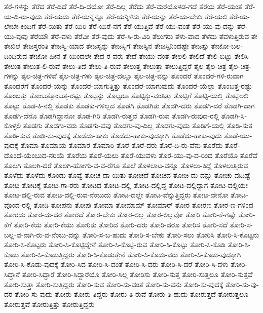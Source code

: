 {ತೆರೆ-ಗಳನ್ನು
ತೆರೆದ
ತೆರೆ-ದಿದೆ
ತೆರೆ-ದಿ-ದೆಯೋ
ತೆರೆ-ದಿಲ್ಲ
ತೆರೆದು
ತೆರೆ-ಮರೆಯೊಳಡ-ಗದೆ
ತೆರೆಯ
ತೆರೆ-ಯಂತೆ
ತೆರೆ-ಯ-ದಿ-ರು-ವುದು
ತೆರೆ-ಯದು
ತೆರೆ-ಯನ್ನಿನ್ನೂ
ತೆರೆ-ಯನ್ನಿಳಿಸು
ತೆರೆ-ಯನ್ನು
ತೆರೆ-ಯ-ಬೇಕು
ತೆರೆ-ಯಲಿ
ತೆರೆ-ಯ-ಲೇಬೇ-ಕಿಂದಿಗೆ
ತೆರೆ-ಯಿತು
ತೆರೆ-ಯಿರಿ
ತೆರೆ-ಯಿರೆ-ನಗೆ
ತೆರೆ-ಯುತ್ತಿವೆ
ತೆರೆ-ಯು-ವಂತೆ
ತೆರೆ-ಯು-ವು-ದನ್ನು
ತೆರೆ-ಯು-ವುವು
ತೆರೆಯೌ
ತೆರೆ-ವಳು
ತೆರೆವೀ
ತೆರೆ-ವುದು
ತೆರೆ-ಸಿ-ರು-ವಿರಿ
ತೆಲುಗರು
ತೆಳು-ವಾದ
ತೆಳೆದು
ತೆವಳುತ್ತಿರುವ
ತೇ
ತೇಖಿಲೆ
ತೇಜಸ್ತರಂತಿ
ತೇಜಸ್ವಿ-ಯಾದ
ತೇಜಸ್ಸನ್ನು
ತೇಜಸ್ಸಿಗೆ
ತೇಜಸ್ಸಿನ
ತೇಜಸ್ಸಿನಿಂದಷ್ಟೇ
ತೇಜಸ್ಸು
ತೇಜೋ-ಬಲ-ದಿಂದಿರುವ
ತೇಜೋ-ಹೀನ-ತೆ-ಯಿಂದಲೇ
ತೇದ-ರ-ವರು
ತೇದೆ
ತೇಯು-ವಂತೆ
ತೇಲಲಿ
ತೇಲಿದೆ
ತೇಲಿ-ಬಿಟ್ಟು
ತೇಲಿಸಿ
ತೇಲುತ
ತೇಲುತ-ಲಿ-ರುವೆ
ತೇಲು-ತಿದೆ
ತೇಲು-ತಿ-ರುವೆ
ತೇಲುತ್ತ
ತೇಲುತ್ತಾ
ತೇಲುತ್ತಿದ್ದರೆ
ತೈಲ
ತೈಲ-ಚಿತ್ರ
ತೈಲ-ಚಿತ್ರ-ಗಳನ್ನು
ತೈಲ-ಚಿತ್ರ-ಗಳಿವೆ
ತೈಲ-ಚಿತ್ರ-ಗಳು
ತೈಲ-ಚಿತ್ರ-ದಲ್ಲೂ
ತೈಲ-ಚಿತ್ರ-ವನ್ನು
ತೊಂದರೆ
ತೊಂದರೆ-ಗಳಿ-ರುವಾಗ
ತೊಂದರೆಗೆ
ತೊಂದರೆ-ಯನ್ನು
ತೊಂದರೆ-ಯಾಗುತ್ತಿತ್ತು
ತೊಂದರೆ-ಯಾಗುವುದು
ತೊಂದರೆ-ಯೆಲ್ಲಾ
ತೊಂಬತ್ತ-ರಷ್ಟು
ತೊಂಬತ್ತು
ತೊಂಬತ್ತೊಂಬತ್ತ-ರಷ್ಟು
ತೊಟ್ಟನ್ನು
ತೊಟ್ಟರೂ
ತೊಟ್ಟಿಕ್ಕು-ವಂತಿತ್ತು
ತೊಟ್ಟಿಗೆ
ತೊಟ್ಟಿ-ಯಲ್ಲಿ
ತೊಟ್ಟಿಲಲಿ
ತೊಟ್ಟು
ತೊಡ-ಕಿ-ನಲ್ಲಿ
ತೊಡಕು
ತೊಡಕು-ಗಳಿಲ್ಲದ
ತೊಡಗಿ
ತೊಡಗಿತು
ತೊಡಗಿ-ದರು
ತೊಡಗಿ-ದರೆ
ತೊಡಗಿ-ದಾಗ
ತೊಡಗಿ-ದೆನೊ
ತೊಡಗಿದ್ದಾನೋ
ತೊಡ-ಗಿರಿ
ತೊಡಗಿ-ರುತ್ತವೆ
ತೊಡಗಿ-ರುವ
ತೊಡಗಿ-ರುವುದ-ರಲ್ಲಿ
ತೊಡಗಿ-ಸಿ-ಕೊಳ್ಳಲಿ
ತೊಡಗು
ತೊಡಗು-ವರು
ತೊಡಗು-ವವು
ತೊಡಗು-ವು-ದಿಲ್ಲ
ತೊಡಗು-ವುದು
ತೊಡಿಗೆ-ಯಲ್ಲಿ
ತೊಡಿ-ಸುತ
ತೊಡಿ-ಸುವ
ತೊಡಿ-ಸು-ವುದಕ್ಕೆ
ತೊಡೆದು-ಹಾಕು
ತೊಡೆದು-ಹಾಕು-ವುದಕ್ಕಾಗಿ
ತೊಡೆದು-ಹಾಕು-ವುದು
ತೊಡೆ-ಯು-ವುದಕ್ಕೆ
ತೊಮಾ
ತೊಮಾಯ
ತೊಮಾರ
ತೊಮಾರಿ
ತೊರೆ
ತೊರೆ-ದರು
ತೊರೆ-ದಿ-ರು-ವೆನು
ತೊರೆದು
ತೊರೆ-ದೊಂದೆ-ಯೆಂಬುದ-ನರಿಯೆ
ತೊರೆಯ
ತೊರೆ-ಯಲು
ತೊರೆ-ಯುವಳು
ತೊರೆ-ಯು-ವು-ದ-ರಿಂದ
ತೊರೆಯೊ
ತೊರೆವೆ
ತೊಲಗಿ
ತೊಲಗಿ-ದರೆ
ತೊಲಗಿ-ಹೋಗು-ವ-ವ-ರೆಗೂ
ತೊಲೆ
ತೊಳಲಾಟ-ವನ್ನೂ
ತೊಳಲು-ತಿದ್ದೆ
ತೊಳಲುತ್ತಿರುವ
ತೊಳೆದು
ತೊಳೆದು-ಕೊಂಡು
ತೊವ್ವೆ
ತೋಚ-ದಾ-ಯಿತು
ತೋಚದೆ
ತೋಚಿದ
ತೋಚಿ-ದು-ದನ್ನು
ತೋಚು-ವುದಿಷ್ಟೆ
ತೋಟ
ತೋಟಕ್ಕೆ
ತೋಟ-ಗಾ-ರರು
ತೋಟದ
ತೋಟ-ದಲ್ಲಿ
ತೋಟ-ದಲ್ಲಿದ್ದ
ತೋಟ-ದಲ್ಲಿದ್ದಾಗ
ತೋಟ-ದಲ್ಲಿಯೇ
ತೋಟ-ದಲ್ಲಿ-ರುವ
ತೋಟ-ದಲ್ಲಿ-ರುವ-ನೆಂಬುದು
ತೋಟ-ದಲ್ಲೇ
ತೋಟ-ವೆನ್ನುತ್ತಿದ್ದರು
ತೋಟ-ವೇನೋ
ತೋಟ-ವೊಂದ-ರಲ್ಲಿ
ತೋಡಿ
ತೋಪನು
ತೋಪು
ತೋಮಾ
ತೋಮಾಮ್
ತೋಮಾರ್
ತೋರ
ತೋರಣ
ತೋರ-ಣ-ಗಳಿಂದ
ತೋರದು
ತೋರ-ದು-ದರ
ತೋರದೆ
ತೋರ-ಬೇಕು
ತೋರ-ಲಿಲ್ಲ
ತೋರ-ಲಿಲ್ಲವೋ
ತೋರಿ
ತೋರಿ-ಕೆ-ಗಷ್ಟೇ
ತೋರಿ-ಕೆಗೆ
ತೋರಿ-ಕೆಯ
ತೋರಿ-ಕೆಯು
ತೋರಿತು
ತೋರಿದ
ತೋರಿ-ದರು
ತೋರಿ-ದರೂ
ತೋರಿಸ
ತೋರಿ-ಸದೆ
ತೋರಿ-ಸ-ಬಲ್ಲ-ವ-ನಾಗಿ-ರು-ವ-ನೆಂಬು-ದನ್ನು
ತೋರಿ-ಸ-ಬ-ಹುದು
ತೋರಿ-ಸ-ಬೇಕು
ತೋರಿ-ಸಲು
ತೋರಿಸಿ
ತೋರಿ-ಸಿ-ಕೊಟ್ಟನು
ತೋರಿ-ಸಿ-ಕೊಟ್ಟರು
ತೋರಿ-ಸಿ-ಕೊಟ್ಟಿದ್ದೇನೆ
ತೋರಿ-ಸಿ-ಕೊಟ್ಟಿ-ರುವ
ತೋರಿ-ಸಿ-ಕೊಟ್ಟು
ತೋರಿ-ಸಿ-ಕೊಡಿ
ತೋರಿ-ಸಿ-ಕೊಡು
ತೋರಿ-ಸಿ-ಕೊಡುತ್ತಿದ್ದರು
ತೋರಿ-ಸಿ-ಕೊಡುತ್ತೇನೆ
ತೋರಿ-ಸಿ-ಕೊಡು-ವರು
ತೋರಿ-ಸಿ-ಕೊಡು-ವುದಕ್ಕಾಗಿ
ತೋರಿ-ಸಿ-ಕೊಡು-ವುದಕ್ಕೆ
ತೋರಿ-ಸಿದ
ತೋರಿ-ಸಿ-ದಂತೆ
ತೋರಿ-ಸಿ-ದರು
ತೋರಿ-ಸಿ-ದರೆ
ತೋರಿ-ಸಿ-ದಳು
ತೋರಿ-ಸಿದ್ದಾನೆ
ತೋರಿ-ಸಿದ್ದಾರೆ
ತೋರಿ-ಸಿದ್ದಾರೆಯೊ
ತೋರಿ-ಸಿಲ್ಲ
ತೋರಿಸು
ತೋರಿ-ಸುತ್ತ
ತೋರಿ-ಸುತ್ತಲೂ
ತೋರಿ-ಸುತ್ತವೆ
ತೋರಿ-ಸುತ್ತಾ
ತೋರಿ-ಸುತ್ತಿದ್ದರು
ತೋರಿ-ಸುವ
ತೋರಿ-ಸು-ವಂತೆ
ತೋರಿ-ಸು-ವನು
ತೋರಿ-ಸು-ವುದಕ್ಕೆ
ತೋರಿ-ಸು-ವು-ದರ
ತೋರಿ-ಸು-ವುದು
ತೋರು
ತೋರು-ತಿದ್ದರು
ತೋರು-ತಿ-ರುವೆ
ತೋರು-ತಿ-ಹುದು
ತೋರುತ್ತದೆ
ತೋರುತ್ತಲೂ
ತೋರುತ್ತವೆ
ತೋರುತ್ತಿತ್ತು
ತೋರುತ್ತಿದ್ದರು
}
